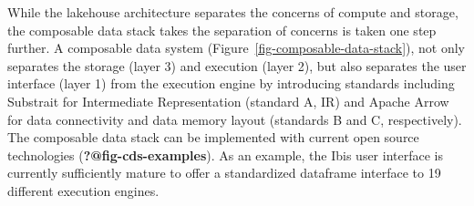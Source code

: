 \documentclass[
  authoryear]{elsarticle}
\begin{document}
While the lakehouse architecture separates the concerns of compute and
storage, the composable data stack takes the separation of concerns is
taken one step further. A composable data system
(Figure~\ref{fig-composable-data-stack}), not only separates the storage
(layer 3) and execution (layer 2), but also separates the user interface
(layer 1) from the execution engine by introducing standards including
Substrait for Intermediate Representation (standard A, IR) and Apache
Arrow for data connectivity and data memory layout (standards B and C,
respectively). The composable data stack can be implemented with current
open source technologies (\textbf{?@fig-cds-examples}). As an example,
the Ibis user interface is currently sufficiently mature to offer a
standardized dataframe interface to 19 different execution engines.
\end{document}
